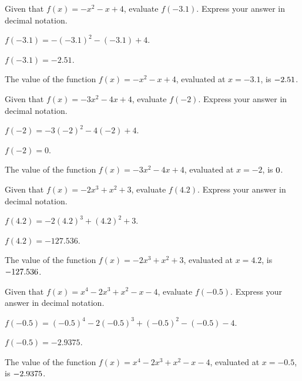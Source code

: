 \begin{shuffle}
\begin{exercise}
Given that $f(x)=-x^2-x+4$, evaluate $f(-3.1)$. Express your answer in decimal notation.
\begin{solution}
\begin{hint}
$f(-3.1)=-(-3.1)^2-(-3.1)+4$.
\end{hint}
\begin{hint}
$f(-3.1)=-2.51$.
\end{hint}
The value of the function $f(x) = -x^2-x+4$, evaluated at $x=-3.1$, is ${-2.51}$.
\end{solution}
\end{exercise}

\begin{exercise}
Given that $f(x)=-3 x^2-4 x+4$, evaluate $f(-2)$. Express your answer in decimal notation.
\begin{solution}
\begin{hint}
$f(-2)=-3 (-2)^2-4 (-2)+4$.
\end{hint}
\begin{hint}
$f(-2)=0$.
\end{hint}
The value of the function $f(x) = -3 x^2-4 x+4$, evaluated at $x=-2$, is ${0}$.
\end{solution}
\end{exercise}

\begin{exercise}
Given that $f(x)=-2 x^3+x^2+3$, evaluate $f(4.2)$. Express your answer in decimal notation.
\begin{solution}
\begin{hint}
$f(4.2)=-2 (4.2)^3+(4.2)^2+3$.
\end{hint}
\begin{hint}
$f(4.2)=-127.536$.
\end{hint}
The value of the function $f(x) = -2 x^3+x^2+3$, evaluated at $x=4.2$, is ${-127.536}$.
\end{solution}
\end{exercise}

\begin{exercise}
Given that $f(x)=x^4-2 x^3+x^2-x-4$, evaluate $f(-0.5)$. Express your answer in decimal notation.
\begin{solution}
\begin{hint}
$f(-0.5)=(-0.5)^4-2 (-0.5)^3+(-0.5)^2-(-0.5)-4$.
\end{hint}
\begin{hint}
$f(-0.5)=-2.9375$.
\end{hint}
The value of the function $f(x) = x^4-2 x^3+x^2-x-4$, evaluated at $x=-0.5$, is ${-2.9375}$.
\end{solution}
\end{exercise}


\end{shuffle}
